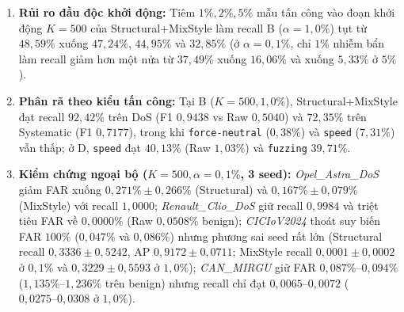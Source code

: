 \documentclass[12pt, a4paper, reqno, oneside]{book}
\DeclareRobustCommand{\code}[1]{\nolinkurl{#1}}
\begin{document}
\begin{enumerate}
    \item \textbf{Rủi ro đầu độc khởi động:} Tiêm $1\%, 2\%, 5\%$ mẫu tấn công vào đoạn khởi động $K=500$ của Structural+MixStyle làm recall B ($\alpha=1{,}0\%$) tụt từ $48{,}59\%$ xuống $47{,}24\%$, $44{,}95\%$ và $32{,}85\%$ (ở $\alpha=0{,}1\%$, chỉ $1\%$ nhiễm bẩn làm recall giảm hơn một nửa từ $37{,}49\%$ xuống $16{,}06\%$ và xuống $5{,}33\%$ ở $5\%$).
    \item \textbf{Phân rã theo kiểu tấn công:} Tại B ($K=500, 1{,}0\%$), Structural+MixStyle đạt recall $92{,}42\%$ trên DoS (F1 $0{,}9438$ vs Raw $0{,}5040$) và $72{,}35\%$ trên Systematic (F1 $0{,}7177$), trong khi \code{force-neutral} ($0{,}38\%$) và \code{speed} ($7{,}31\%$) vẫn thấp; ở D, \code{speed} đạt $40{,}13\%$ (Raw $1{,}03\%$) và \code{fuzzing} $39{,}71\%$.
    \item \textbf{Kiểm chứng ngoại bộ ($K=500, \alpha=0{,}1\%$, 3 seed):} \textit{Opel\_Astra\_DoS} giảm FAR xuống $0{,}271\% \pm 0{,}266\%$ (Structural) và $0{,}167\% \pm 0{,}079\%$ (MixStyle) với recall $1{,}0000$; \textit{Renault\_Clio\_DoS} giữ recall $0{,}9984$ và triệt tiêu FAR về $0{,}0000\%$ (Raw $0{,}0508\%$ benign); \textit{CICIoV2024} thoát suy biến FAR $100\%$ ($0{,}047\%$ và $0{,}086\%$) nhưng phương sai seed rất lớn (Structural recall $0{,}3336 \pm 0{,}5242$, AP $0{,}9172 \pm 0{,}0711$; MixStyle recall $0{,}0001 \pm 0{,}0002$ ở $0{,}1\%$ và $0{,}3229 \pm 0{,}5593$ ở $1{,}0\%$); \textit{CAN\_MIRGU} giữ FAR $0{,}087\%\text{--}0{,}094\%$ ($1{,}135\%\text{--}1{,}236\%$ trên benign) nhưng recall chỉ đạt $0{,}0065\text{--}0{,}0072$ ($0{,}0275\text{--}0{,}0308$ ở $1{,}0\%$).
\end{enumerate}
\end{document}
